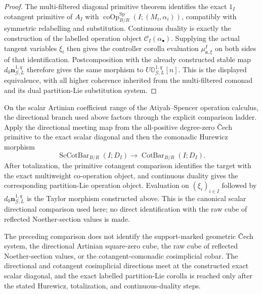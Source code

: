 \begin{proof}
The multi-filtered diagonal primitive theorem identifies the exact $1_I$ cotangent
primitive of $A_I$ with
$\operatorname{coOp}^{\mathrm{Sp}}_{B/R}(I;(M_i,\alpha_i))$, compatibly with
symmetric relabelling and substitution.  Continuous duality is exactly the
construction of the labelled operation object
$\mathcal C_I(\alpha_\bullet)$.  Supplying the actual tangent variables $\xi_i$
then gives the controller corolla evaluation
$\mu^I_{\mathfrak a,\xi}$ on both sides of that identification.  Postcomposition
with the already constructed stable map
$d_0\mathbf n_{\mathcal G,L}^{1,q}$ therefore gives the same morphism to
$U\mathbb O_{\mathcal G,L}^{1,q}[n]$.  This is the displayed equivalence, with all
higher coherence inherited from the multi-filtered comonad and its dual
partition-Lie substitution system.
\end{proof}

\begin{construction}
\label{constr:symmetry-noether-taylor-operation-comparison-on-the-scalar-artinian-overlap}
On the scalar Artinian coefficient range of the Atiyah--Spencer operation
calculus, the directional branch used above factors through the explicit comparison
ladder.  Apply the directional meeting map from the all-positive degree-zero
\v{C}ech primitive to the exact scalar diagonal and then the comonadic Hurewicz
morphism
\[
\operatorname{ScCotBar}_{B/R}(I;D_I)
\longrightarrow
\operatorname{CotBar}_{B/R}(I;D_I).
\]
After totalization, the primitive cotangent comparison identifies the target with
the exact multiweight co-operation object, and continuous duality gives the
corresponding partition-Lie operation object.  Evaluation on
$(\xi_i)_{i\in I}$ followed by
$d_0\mathbf n_{\mathcal G,L}^{1,q}$ is the Taylor morphism constructed above.
This is the canonical scalar directional comparison used here; no direct
identification with the raw cube of reflected Noether-section values is made.
\end{construction}

\begin{proposition}
\label{prop:symmetry-noether-non-conflation-of-directional-and-cotangent-operation-systems}
The preceding comparison does not identify the support-marked geometric
\v{C}ech system, the directional Artinian square-zero cube, the raw cube of
reflected Noether-section values, or the cotangent-comonadic cosimplicial cobar.
The directional and cotangent cosimplicial directions meet at the constructed exact
scalar diagonal, and the exact labelled partition-Lie corolla is reached only after
the stated Hurewicz, totalization, and continuous-duality steps.
\end{proposition}

